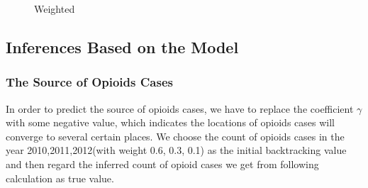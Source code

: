 \documentclass[12pt]{article}
\begin{document}
\begin{figure}[h]
\centering
{}
\caption{Weighted}
\label{weigh}
\end{figure}

\subsection{Inferences Based on the Model}

\subsubsection{The Source of Opioids Cases}
In order to predict the source of opioids cases, we have to replace the coefficient $\gamma$ with some negative value, which indicates the locations of opioids cases will converge to several certain places. We choose the count of opioids cases in the year 2010,2011,2012(with weight 0.6, 0.3, 0.1) as the initial backtracking value and then regard the inferred count of opioid cases we get from following calculation as true value.
\end{document}
